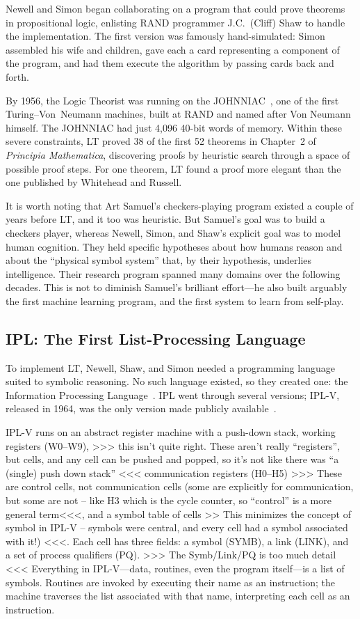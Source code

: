 \documentclass[journal]{IEEEtran}
\begin{document}
Newell and Simon began collaborating on a program that could prove
theorems in propositional logic, enlisting RAND programmer J.C.\
(Cliff) Shaw to handle the implementation. The first version was
famously hand-simulated: Simon assembled his wife and children, gave
each a card representing a component of the program, and had them
execute the algorithm by passing cards back and forth.

By 1956, the Logic Theorist was running on the
JOHNNIAC~\cite{gruenberger1968johnniac}, one of the first
Turing--Von~Neumann machines, built at RAND and named after Von
Neumann himself. The JOHNNIAC had just 4,096 40-bit words of
memory. Within these severe constraints, LT proved 38 of the first 52
theorems in Chapter~2 of \textit{Principia Mathematica}, discovering
proofs by heuristic search through a space of possible proof steps.
For one theorem, LT found a proof more elegant than the one published
by Whitehead and Russell.

It is worth noting that Art Samuel's checkers-playing program existed
a couple of years before LT, and it too was heuristic. But Samuel's
goal was to build a checkers player, whereas Newell, Simon, and Shaw's
explicit goal was to model human cognition. They held specific
hypotheses about how humans reason and about the ``physical symbol
system'' that, by their hypothesis, underlies intelligence. Their
research program spanned many domains over the following decades. This
is not to diminish Samuel's brilliant effort---he also built arguably
the first machine learning program, and the first system to learn from
self-play.

\subsection{IPL: The First List-Processing Language}

To implement LT, Newell, Shaw, and Simon needed a programming language
suited to symbolic reasoning. No such language existed, so they
created one: the Information Processing Language~\cite{newell1961ipl}.
IPL went through several versions; IPL-V, released in 1964, was the
only version made publicly available~\cite{newell1964iplv}.

IPL-V runs on an abstract register machine with a push-down stack,
working registers (W0--W9), >>> this isn't quite right. These aren't
really ``registers'', but cells, and any cell can be pushed and
popped, so it's not like there was ``a (single) push down stack'' <<<
communication registers (H0--H5) >>> These are control cells, not
communication cells (some are explicitly for communication, but some
are not -- like H3 which is the cycle counter, so ``control'' is a
more general term<<<, and a symbol table of cells >> This minimizes
the concept of symbol in IPL-V -- symbols were central, and every cell
had a symbol associated with it!) <<<. Each cell has three fields: a
symbol (SYMB), a link (LINK), and a set of process qualifiers
(PQ). >>> The Symb/Link/PQ is too much detail <<< Everything in
IPL-V---data, routines, even the program itself---is a list of
symbols. Routines are invoked by executing their name as an
instruction; the machine traverses the list associated with that name,
interpreting each cell as an instruction.
\end{document}
